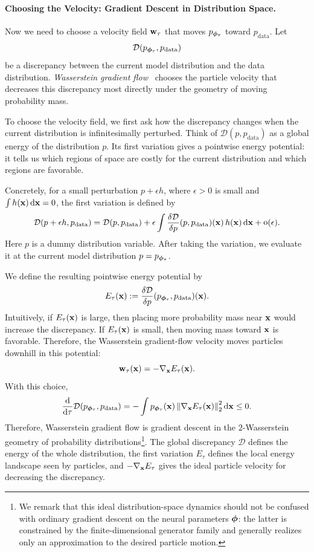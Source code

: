 \paragraph{Choosing the Velocity: Gradient Descent in Distribution Space.}
Now we need to choose a velocity field ${\mathbf{w}}_\tau$ that moves
$p_{{\bm{\phi}}_\tau}$ toward $p_{\mathrm{data}}$.  Let
\[
    \mathcal{D}(p_{{\bm{\phi}}_\tau},p_{\mathrm{data}})
\]
be a discrepancy between the current model distribution and the data
distribution.  \emph{Wasserstein gradient flow}~\citep{jordan1998variational,ambrosio2005gradient} chooses the particle velocity that
decreases this discrepancy most directly under the geometry of moving
probability mass.

To choose the velocity field, we first ask how the discrepancy changes when the
current distribution is infinitesimally perturbed.  Think of
$\mathcal{D}(p,p_{\mathrm{data}})$ as a global energy of the distribution
$p$.  Its first variation gives a pointwise energy potential: it tells us
which regions of space are costly for the current distribution and which regions
are favorable.

Concretely, for a small perturbation $p+\epsilon h$, where
$\epsilon>0$ is small and $\int h({\mathbf{x}})\mathop{}\!\mathrm{d}{\mathbf{x}}=0$, the first variation is
defined by
\[
    \mathcal{D}(p+\epsilon h,p_{\mathrm{data}})
    =
    \mathcal{D}(p,p_{\mathrm{data}})
    +
    \epsilon
    \int
    \frac{\delta\mathcal{D}}{\delta p}
    (p,p_{\mathrm{data}})({\mathbf{x}})\,
    h({\mathbf{x}})\mathop{}\!\mathrm{d}{\mathbf{x}}
    +
    \mathop{\mathrm{o}}(\epsilon).
\]
Here $p$ is a dummy distribution variable.  After taking the variation, we
evaluate it at the current model distribution $p=p_{{\bm{\phi}}_\tau}$.

We define the resulting pointwise energy potential by
\[
    E_\tau({\mathbf{x}})
    :=
    \frac{\delta\mathcal{D}}{\delta p}
    (p_{{\bm{\phi}}_\tau},p_{\mathrm{data}})({\mathbf{x}}).
\]
Intuitively, if $E_\tau({\mathbf{x}})$ is large, then placing more probability mass
near ${\mathbf{x}}$ would increase the discrepancy.  If $E_\tau({\mathbf{x}})$ is small,
then moving mass toward ${\mathbf{x}}$ is favorable.  Therefore, the Wasserstein
gradient-flow velocity moves particles downhill in this potential:
\[
    {\mathbf{w}}_\tau({\mathbf{x}})
    =
    -
    \nabla_{{\mathbf{x}}}E_\tau({\mathbf{x}}).
\]
With this choice,
\[
    \frac{\mathop{}\!\mathrm{d}}{\mathop{}\!\mathrm{d} \tau}
    \mathcal{D}(p_{{\bm{\phi}}_\tau},p_{\mathrm{data}})
    =
    -
    \int
    p_{{\bm{\phi}}_\tau}({\mathbf{x}})
    \left\|
        \nabla_{{\mathbf{x}}}E_\tau({\mathbf{x}})
    \right\|_2^2
    \mathop{}\!\mathrm{d}{\mathbf{x}}
    \le 0.
\]
Therefore, Wasserstein gradient flow is gradient descent in the
$2$-Wasserstein geometry of probability distributions\footnote{We remark that this ideal
distribution-space dynamics should not be confused with ordinary gradient
descent on the neural parameters ${\bm{\phi}}$: the latter is constrained by the
finite-dimensional generator family and generally realizes only an
approximation to the desired particle motion.}.  The global discrepancy $\mathcal{D}$ defines the
energy of the whole distribution, the first variation $E_\tau$ defines the
local energy landscape seen by particles, and
$-\nabla_{{\mathbf{x}}}E_\tau$ gives the ideal particle velocity for decreasing the
discrepancy.

